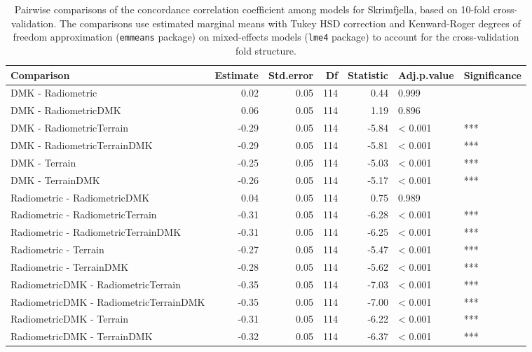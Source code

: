 \documentclass[soil, manuscript]{copernicus}
\begin{document}
\newpage
\section{}

\begin{table}[h]

\caption{\label{tab:pairwiseSkrimCCC}Pairwise comparisons of the concordance correlation coefficient among models for Skrimfjella, based on 10-fold cross-validation. The comparisons use estimated marginal means with Tukey HSD correction and Kenward-Roger degrees of freedom approximation (\texttt{emmeans} package) on mixed-effects models (\texttt{lme4} package) to account for the cross-validation fold structure.}
\centering
\begin{tabular}[t]{lrrrrll}
\hline
Comparison & Estimate & Std.error & Df & Statistic & Adj.p.value & Significance\\
\hline
DMK - Radiometric & 0.02 & 0.05 & 114 & 0.44 & 0.999 & \\
DMK - RadiometricDMK & 0.06 & 0.05 & 114 & 1.19 & 0.896 & \\
DMK - RadiometricTerrain & -0.29 & 0.05 & 114 & -5.84 & < 0.001 & ***\\
DMK - RadiometricTerrainDMK & -0.29 & 0.05 & 114 & -5.81 & < 0.001 & ***\\
DMK - Terrain & -0.25 & 0.05 & 114 & -5.03 & < 0.001 & ***\\
DMK - TerrainDMK & -0.26 & 0.05 & 114 & -5.17 & < 0.001 & ***\\
Radiometric - RadiometricDMK & 0.04 & 0.05 & 114 & 0.75 & 0.989 & \\
Radiometric - RadiometricTerrain & -0.31 & 0.05 & 114 & -6.28 & < 0.001 & ***\\
Radiometric - RadiometricTerrainDMK & -0.31 & 0.05 & 114 & -6.25 & < 0.001 & ***\\
Radiometric - Terrain & -0.27 & 0.05 & 114 & -5.47 & < 0.001 & ***\\
Radiometric - TerrainDMK & -0.28 & 0.05 & 114 & -5.62 & < 0.001 & ***\\
RadiometricDMK - RadiometricTerrain & -0.35 & 0.05 & 114 & -7.03 & < 0.001 & ***\\
RadiometricDMK - RadiometricTerrainDMK & -0.35 & 0.05 & 114 & -7.00 & < 0.001 & ***\\
RadiometricDMK - Terrain & -0.31 & 0.05 & 114 & -6.22 & < 0.001 & ***\\
RadiometricDMK - TerrainDMK & -0.32 & 0.05 & 114 & -6.37 & < 0.001 & ***\\

\end{tabular}
\end{table}
\end{document}
